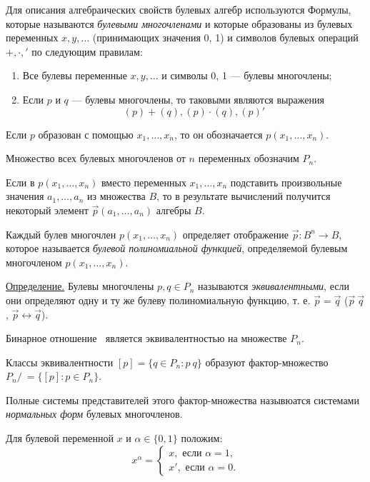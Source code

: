 \documentclass[12pt]{article}
\begin{document}
\par Для описания алгебраических свойств булевых алгебр используются Формулы, которые называются \textit{булевыми многочленами} и которые образованы из булевых переменных $x, y, \dots$ (принимающих значения 0, 1) и символов булевых операций $+, \cdot, '$ по следующим правилам:
\begin{enumerate}
    \item Все булевы переменные $x, y, \dots$ и символы 0, 1 --- булевы многочлены;
    \item Если $p$ и $q$ --- булевы многочлены, то таковыми являются выражения
    \begin{equation*}
        (p)+(q), (p) \cdot (q), (p)'
    \end{equation*}
\end{enumerate}
\par Если $p$ образован с помощью $x_1, \dots, x_n$, то он обозначается $p(x_1, \dots, x_n)$.
\par Множество всех булевых многочленов от $n$ переменных обозначим $P_n$.
\par Если в $p(x_1, \dots, x_n)$ вместо переменных $x_1, \dots, x_n$ подставить произвольные значения $a_1, \dots, a_n$ из множества $B$, то в результате вычислений получится некоторый элемент $\vec p(a_1, \dots, a_n)$ алгебры $B$.
\par Каждый булев многочлен $p(x_1, \dots, x_n)$ определяет отображение $\vec p: B^n \to B$, которое называется \textit{булевой полиномиальной функцией}, определяемой булевым многочленом $p(x_1, \dots, x_n)$.
\par \underline{Определение.} Булевы многочлены $p, q \in P_n$ называются \textit{эквивалентными}, если они определяют одну и ту же булеву полиномиальную функцию, т. е. $\vec p = \vec q$ ($\vec p ~ \vec q$, $\vec p \leftrightarrow \vec q$).
\par Бинарное отношение $~$ является эквивалентностью на множестве $P_n$.
\par Классы эквивалентности $[p]=\{q \in P_n : p ~ q\}$ образуют фактор-множество $P_n /~ = \{[p]: p \in P_n\}$.
\par Полные системы представителей этого фактор-множества назывюатся системами \textit{нормальных форм} булевых многочленов.
\par Для булевой переменной $x$ и $\alpha \in \{0,1\}$ положим:
\begin{equation}
    x^\alpha = \begin{cases}
        x, \text{ если } \alpha = 1,\\
        x', \text{ если } \alpha = 0.
    \end{cases}
\end{equation}
\end{document}

